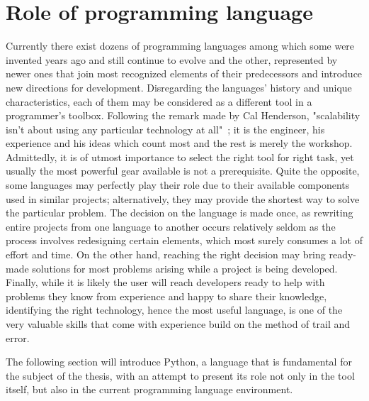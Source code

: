\section{Role of programming language}\label{sec:languages}
Currently there exist dozens of programming languages among which some were invented years ago and still continue to evolve and the other, represented by newer ones that join most recognized elements of their predecessors and introduce new directions for development. Disregarding the languages' history and unique characteristics, each of them may be considered as a different tool in a programmer's toolbox. Following the remark made by Cal Henderson, "scalability isn't about using any particular technology at all"~\cite[page 203]{build_scalable}; it is the engineer, his experience and his ideas which count most and the rest is merely the workshop. Admittedly, it is of utmost importance to select the right tool for right task, yet usually the most powerful gear available is not a prerequisite. Quite the opposite, some languages may perfectly play their role due to their available components used in similar projects; alternatively, they may provide the shortest way to solve the particular problem. The decision on the language is made once, as rewriting entire projects from one language to another occurs relatively seldom as the process involves redesigning certain elements, which most surely consumes a lot of effort and time. On the other hand, reaching the right decision may bring ready-made solutions for most problems arising while a project is being developed. Finally, while it is likely the user will reach developers ready to help with problems they know from experience and happy to share their knowledge, identifying the right technology, hence the most useful language, is one of the very valuable skills that come with experience build on the method of trail and error. 

The following section will introduce Python, a language that is fundamental for the subject of the thesis, with an attempt to present its role not only in the tool itself, but also in the current programming language environment.
  
